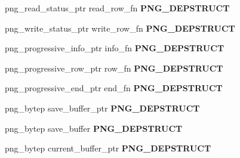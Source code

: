 \begin{DoxyCompactItemize}
\item 
\hypertarget{structpng__struct__def_a72082606b1b21ba53485ba96aa4caa59}{png\-\_\-read\-\_\-status\-\_\-ptr read\-\_\-row\-\_\-fn {\bfseries P\-N\-G\-\_\-\-D\-E\-P\-S\-T\-R\-U\-C\-T}}\label{structpng__struct__def_a72082606b1b21ba53485ba96aa4caa59}

\item 
\hypertarget{structpng__struct__def_a2d56ee7ff4dfa3172f47bd041943d01f}{png\-\_\-write\-\_\-status\-\_\-ptr write\-\_\-row\-\_\-fn {\bfseries P\-N\-G\-\_\-\-D\-E\-P\-S\-T\-R\-U\-C\-T}}\label{structpng__struct__def_a2d56ee7ff4dfa3172f47bd041943d01f}

\item 
\hypertarget{structpng__struct__def_a401c15143f20f6d09bbabfe7de5e6614}{png\-\_\-progressive\-\_\-info\-\_\-ptr info\-\_\-fn {\bfseries P\-N\-G\-\_\-\-D\-E\-P\-S\-T\-R\-U\-C\-T}}\label{structpng__struct__def_a401c15143f20f6d09bbabfe7de5e6614}

\item 
\hypertarget{structpng__struct__def_acf9c68733ddde320c69fb5031505b884}{png\-\_\-progressive\-\_\-row\-\_\-ptr row\-\_\-fn {\bfseries P\-N\-G\-\_\-\-D\-E\-P\-S\-T\-R\-U\-C\-T}}\label{structpng__struct__def_acf9c68733ddde320c69fb5031505b884}

\item 
\hypertarget{structpng__struct__def_a97c8d4cb55c8dfd52d983fc1c0dfea25}{png\-\_\-progressive\-\_\-end\-\_\-ptr end\-\_\-fn {\bfseries P\-N\-G\-\_\-\-D\-E\-P\-S\-T\-R\-U\-C\-T}}\label{structpng__struct__def_a97c8d4cb55c8dfd52d983fc1c0dfea25}

\item 
\hypertarget{structpng__struct__def_a62b9e3e8adb079f36e2f44650b461747}{png\-\_\-bytep save\-\_\-buffer\-\_\-ptr {\bfseries P\-N\-G\-\_\-\-D\-E\-P\-S\-T\-R\-U\-C\-T}}\label{structpng__struct__def_a62b9e3e8adb079f36e2f44650b461747}

\item 
\hypertarget{structpng__struct__def_a8103b4daa127e7d94c6236b8eb52a931}{png\-\_\-bytep save\-\_\-buffer {\bfseries P\-N\-G\-\_\-\-D\-E\-P\-S\-T\-R\-U\-C\-T}}\label{structpng__struct__def_a8103b4daa127e7d94c6236b8eb52a931}

\item 
\hypertarget{structpng__struct__def_a1e5202e3bddd6ed6618a0a401cca38b0}{png\-\_\-bytep current\-\_\-buffer\-\_\-ptr {\bfseries P\-N\-G\-\_\-\-D\-E\-P\-S\-T\-R\-U\-C\-T}}\label{structpng__struct__def_a1e5202e3bddd6ed6618a0a401cca38b0}


\end{DoxyCompactItemize}
